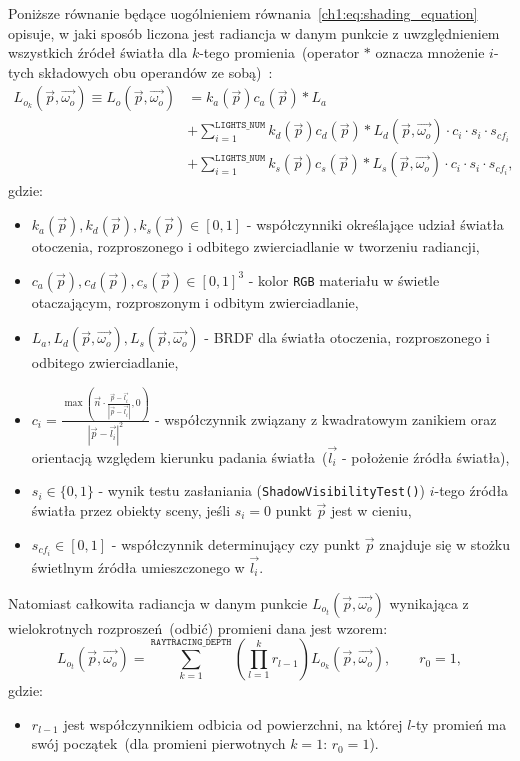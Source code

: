 \begin{enumerate}
Poniższe równanie będące uogólnieniem równania~\eqref{ch1:eq:shading_equation} opisuje, w jaki sposób liczona jest radiancja w danym punkcie z uwzględnieniem wszystkich źródeł światła dla $k$-tego promienia~(operator $*$ oznacza mnożenie $i$-tych składowych obu operandów ze sobą)~\cite{RTFTGU}:
\begin{align}
\label{ch3:eq:shading_equation_general}
L_{o_k}(\vec{p}, \vec{\omega_o}) \equiv L_o(\vec{p}, \vec{\omega_o}) &= k_a(\vec{p})c_a(\vec{p}) * L_a\nonumber\\
&+ \sum_{i=1}^{\mathtt{LIGHTS\_NUM}} k_d(\vec{p})c_d(\vec{p}) * L_d(\vec{p}, \vec{\omega_o}) \cdot c_i\cdot s_i\cdot s_{cf_i} \nonumber\\
&+ \sum_{i=1}^{\mathtt{LIGHTS\_NUM}} k_s(\vec{p})c_s(\vec{p}) * L_s(\vec{p}, \vec{\omega_o}) \cdot c_i\cdot s_i\cdot s_{cf_i},
\end{align}
gdzie:
\begin{itemize}
\item $k_a(\vec{p}), k_d(\vec{p}), k_s(\vec{p}) \in [0, 1]$ - współczynniki określające udział światła otoczenia, rozproszonego i odbitego zwierciadlanie w tworzeniu radiancji,
\item $c_a(\vec{p}), c_d(\vec{p}), c_s(\vec{p}) \in [0, 1]^3$ - kolor \texttt{RGB} materiału w świetle otaczającym, rozproszonym i odbitym zwierciadlanie,
\item $L_a, L_d(\vec{p}, \vec{\omega_o}), L_s(\vec{p}, \vec{\omega_o})$ - BRDF dla światła otoczenia, rozproszonego i odbitego zwierciadlanie,
\item $c_i = \frac{\max\left(\vec{n} \cdot \frac{\vec{p} - \vec{l_i}}{|\vec{p} - \vec{l_i}|}  , 0\right)}{|\vec{p} - \vec{l_i}|^2} $ - współczynnik związany z kwadratowym zanikiem oraz orientacją względem kierunku padania światła~($\vec{l_i}$ - położenie źródła światła),
\item $s_i\in\lbrace 0, 1 \rbrace$ - wynik testu zasłaniania (\texttt{ShadowVisibilityTest()}) $i$-tego źródła światła przez obiekty sceny, jeśli $s_i=0$ punkt $\vec{p}$ jest w cieniu,
\item $s_{cf_i}\in[0, 1]$ - współczynnik determinujący czy punkt $\vec{p}$ znajduje się w stożku świetlnym źródła umieszczonego w $\vec{l_i}$.
\end{itemize}

Natomiast całkowita radiancja w danym punkcie $L_{o_t}(\vec{p}, \vec{\omega_o})$ wynikająca z wielokrotnych rozproszeń~(odbić) promieni dana jest wzorem:
\begin{equation}
L_{o_t}(\vec{p}, \vec{\omega_o}) = \sum_{k=1}^{\mathtt{RAYTRACING\_DEPTH}}\left(\prod_{l=1}^k r_{l-1} \right)L_{o_k}(\vec{p}, \vec{\omega_o}), \qquad r_0 = 1,
\label{ch3:eq:total_radiance}
\end{equation}
gdzie:
\begin{itemize}
\item[] $r_{l-1}$ jest współczynnikiem odbicia od powierzchni, na której $l$-ty promień ma swój początek~(dla promieni pierwotnych $k=1$: $r_0=1$). 
\end{itemize}


\end{enumerate}
